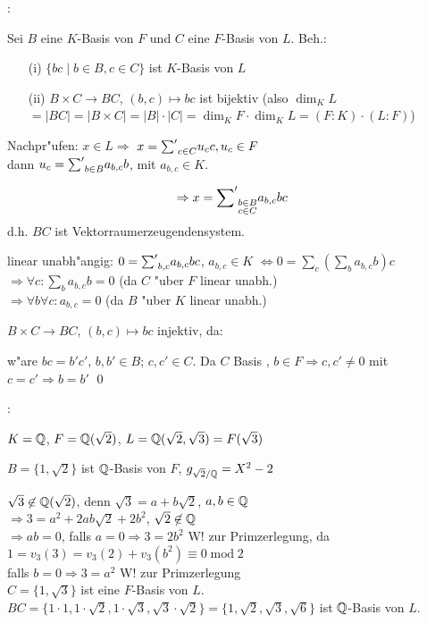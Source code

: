 \proof{}:{Sei $B$ eine $K$-Basis von $F$ und $C$ eine $F$-Basis von $L$.
 Beh.:\begin{enumerate}
 \item[(i)] $\{bc\mid b\in B, c\in C\}$ ist $K$-Basis von $L$
 \item[(ii)] $B\times C\longrightarrow BC$, $(b,c)\mapsto bc$ ist bijektiv (also $\operatorname{dim}_KL$
 $=|BC|=|B\times C|=|B|\cdot |C|=\operatorname{dim}_K F\cdot \operatorname{dim}_K L=(F:K)\cdot(L:F)$)
 \end{enumerate}
 Nachpr"ufen: $x\in L \Rightarrow$
 $x={\sum\nolimits'}_{c\in C} u_c c, u_c\in F$\\
 dann $u_c={\sum\nolimits'}_{b\in B}a_{b,c}b$,
 mit $a_{b,c}\in K$.
 
 \[\Rightarrow x={\sum\nolimits'}_{\substack{b\in B\\ c\in C}}a_{b,c}bc\]
 d.h. $BC$ ist Vektorraumerzeugendensystem.
 
 linear unabh"angig: $0={\sum\nolimits'}_{b,c}a_{b,c}bc$, $a_{b,c}\in K$
 $\iff 0=\sum_{c}(\sum_{b}a_{b,c}b)c$\\
 $\Rightarrow \forall c: \sum_{b}a_{b,c}b=0$ (da $C$ "uber $F$ linear unabh.)\\
 $\Rightarrow \forall b \forall c: a_{b,c}=0$ (da $B$ "uber $K$ linear unabh.)
 
 $B\times C\longrightarrow BC$, $(b,c)\mapsto bc$ injektiv, da:
 
 w"are $bc=b'c'$, $b,b'\in B$; $c,c'\in C$. Da $C$ Basis , $b\in F \Rightarrow c,c'\neq 0$ mit 
 $c=c' \Rightarrow b=b'$
 \qed
 }
:{$K=\mathbb Q$, $F=\mathbb Q(\sqrt{2})$, $L=\mathbb Q(\sqrt{2},\sqrt{3})=F(\sqrt{3})$

 $B=\{1,\sqrt{2}\}$ ist $\mathbb Q$-Basis von $F$, $g_{\sqrt{2}/\mathbb Q}=X^2-2$

 $\sqrt{3} \not\in \mathbb Q(\sqrt{2})$, denn $\sqrt{3}=a+b\sqrt{2}$, $a,b\in \mathbb Q$\\
 $\Rightarrow 3=a^2 + 2ab\sqrt{2}+2b^2$, $\sqrt{2}\not\in \mathbb Q$\\
 $\Rightarrow ab=0$, falls $a=0 \Rightarrow 3=2b^2$ W! zur Primzerlegung, da
 $1=v_3(3)=v_3(2)+v_3(b^2)\equiv 0 \operatorname{mod} 2$\\
 falls $b=0 \Rightarrow 3=a^2$ W! zur Primzerlegung\\
 $C=\{1,\sqrt{3}\}$ ist eine $F$-Basis von $L$. $BC=\{1\cdot 1, 1\cdot \sqrt{2}, 1\cdot \sqrt{3},
 \sqrt{3}\cdot \sqrt{2}\}=\{ 1,\sqrt{2}, \sqrt{3},\sqrt{6}\}$ ist $\mathbb Q$-Basis von $L$.
}
